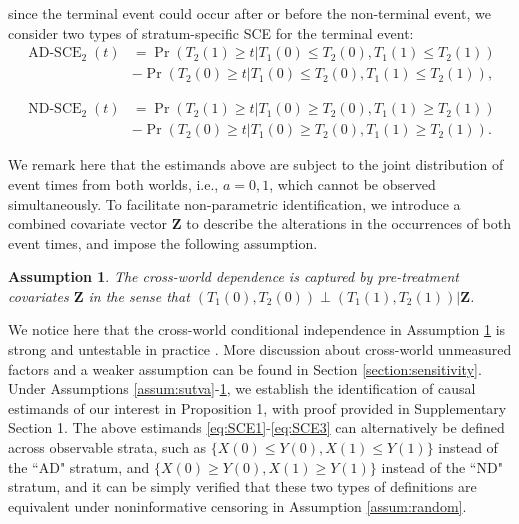\documentclass[aoas]{imsart}
\theoremstyle{plain}
\newtheorem{assum}{Assumption}
\def\bfZ{\mathbf{Z}}
\def\Pr{\operatorname{Pr}}
\begin{document}
since the terminal event could occur after or before the non-terminal event, 
we consider two types of stratum-specific SCE for the terminal event:
\begin{equation}
\begin{split}
\operatorname{AD-SCE}_2(t)
&=\Pr(T_2(1)\geq t|T_1(0)\leq T_2(0),T_1(1)\leq T_2(1))\\
&-\Pr(T_2(0)\geq t|T_1(0)\leq T_2(0),T_1(1)\leq T_2(1)),
\label{eq:SCE2}
\end{split}
\end{equation}

\begin{equation}
\begin{split}
\operatorname{ND-SCE}_2(t)
&=\Pr(T_2(1)\geq t|T_1(0)\geq T_2(0),T_1(1)\geq T_2(1))\\
&-\Pr(T_2(0)\geq t|T_1(0)\geq T_2(0),T_1(1)\geq T_2(1)).
\label{eq:SCE3}
\end{split}
\end{equation}


We remark here that the estimands above are subject to the joint distribution of event times from both worlds, i.e., $a=0,1$, which cannot be observed simultaneously. To facilitate non-parametric identification, we introduce a combined covariate vector $\bfZ$ to describe the alterations in the occurrences of both event times, and impose the following assumption. 
\begin{assum}
The cross-world dependence is captured by pre-treatment covariates $\bfZ$ in the sense that $(T_1(0),T_2(0))\perp (T_1(1),T_2(1))|\bfZ$.
\label{assum: covariate}
\end{assum}


We notice here that the cross-world conditional independence in Assumption \ref{assum: covariate} is strong and untestable in practice \citep{richardson2013single,robins2022interventionist,stensrud2021discussion}.
More discussion about cross-world unmeasured factors and a weaker assumption can be found in Section \ref{section:sensitivity}. Under Assumptions \ref{assum:sutva}-\ref{assum: covariate}, we establish the identification of causal estimands of our interest in Proposition 1, with proof provided in Supplementary Section 1. The above estimands \eqref{eq:SCE1}-\eqref{eq:SCE3} can alternatively be defined across observable strata, such as $\{X(0) \leq Y(0), X(1) \leq Y(1)\}$ instead of the ``AD" stratum, and $\{X(0) \geq Y(0), X(1) \geq Y(1)\}$ instead of the ``ND" stratum, and it can be simply verified that these two types of definitions are equivalent under noninformative censoring in Assumption \ref{assum:random}.
\end{document}
